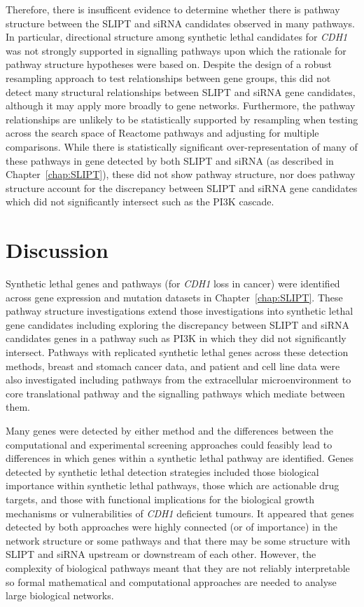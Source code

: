 Therefore, there is insufficent evidence to determine whether there is pathway structure between the \gls{SLIPT} and \gls{siRNA} candidates observed in many pathways. In particular, directional structure among synthetic lethal candidates for \textit{CDH1} was not strongly supported in signalling pathways upon which the rationale for pathway structure hypotheses were based on. Despite the design of a robust resampling approach to test relationships between gene groups, this did not detect many structural relationships between \gls{SLIPT} and \gls{siRNA} gene candidates, although it may apply more broadly to gene networks. Furthermore, the pathway relationships are unlikely to be statistically supported by resampling when testing across the search space of Reactome pathways and adjusting for multiple comparisons. While there is statistically significant over-representation of many of these pathways in gene detected by both \gls{SLIPT} and \gls{siRNA} (as described in Chapter~\ref{chap:SLIPT}), these did not show pathway structure, nor does pathway structure account for the discrepancy between \gls{SLIPT} and \gls{siRNA} gene candidates which did not significantly intersect such as the \gls{PI3K} cascade. 


\FloatBarrier

\section{Discussion}

Synthetic lethal genes and pathways (for \textit{CDH1} loss in cancer) were identified across gene expression and mutation datasets in Chapter~\ref{chap:SLIPT}. These pathway structure investigations extend those investigations into synthetic lethal gene candidates including exploring the discrepancy between \gls{SLIPT} and \gls{siRNA} candidates genes in a pathway such as \gls{PI3K} in which they did not significantly intersect. Pathways with replicated synthetic lethal genes across these detection methods, breast and stomach cancer data, and patient and cell line data were also investigated including pathways from the extracellular microenvironment to core translational pathway and the signalling pathways which mediate between them.

Many genes were detected by either method and the differences between the computational and experimental screening approaches could feasibly lead to differences in which genes within a synthetic lethal pathway are identified. Genes detected by synthetic lethal detection strategies included those biological importance within synthetic lethal pathways, those which are actionable drug targets, and those with functional implications for the biological growth mechanisms or vulnerabilities of \textit{CDH1} deficient tumours. It appeared that genes detected by both approaches were highly connected (or of importance) in the network structure or some pathways and that there may be some structure with \gls{SLIPT} and \gls{siRNA} upstream or downstream of each other. However, the complexity of biological pathways meant that they are not reliably interpretable so formal mathematical and computational approaches are needed to analyse large biological networks.

